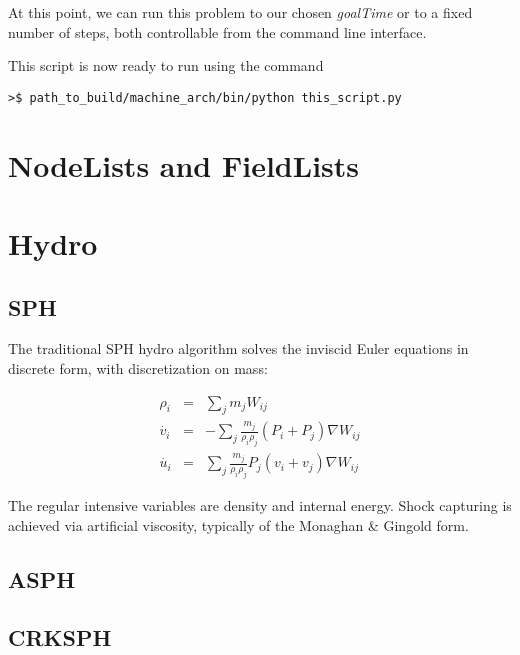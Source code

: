 \documentclass[11pt]{memoir}
\newcommand{\ba}{\begin{eqnarray}}
\newcommand{\ea}{\end{eqnarray}}
\begin{document}


At this point, we can run this problem to our chosen \textit{goalTime} or to a fixed number of steps, both controllable from the command line interface.



This script is now ready to run using the command

\lstset{basicstyle=\small,style=myCustomShellStyle}

\begin{lstlisting}
>$ path_to_build/machine_arch/bin/python this_script.py
\end{lstlisting} 

\chapter{NodeLists and FieldLists}

\chapter{Hydro}

\section{SPH}

The traditional SPH hydro algorithm solves the inviscid Euler equations in discrete form, with discretization on mass:

\ba
\rho_i &=& \sum_j m_j W_{ij}\\
\dot{v_i} &=& - \sum_j \frac{m_j}{\rho_i\rho_j}\left(P_i+P_j\right)\nabla W_{ij}\\
\dot{u_i} &=& \sum_j \frac{m_j}{\rho_i\rho_j}P_j\left(v_i+v_j\right)\nabla W_{ij}
\ea


The regular intensive variables are density and internal energy. 
Shock capturing is achieved via artificial viscosity, typically of the Monaghan \& Gingold form.



\section{ASPH}
\section{CRKSPH}
\end{document}

